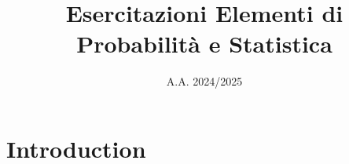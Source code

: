 \documentclass{article}
\title{Esercitazioni Elementi di Probabilità e Statistica}
\date{A.A. 2024/2025}
\begin{document}
\maketitle

\section{Introduction}
\end{document}
